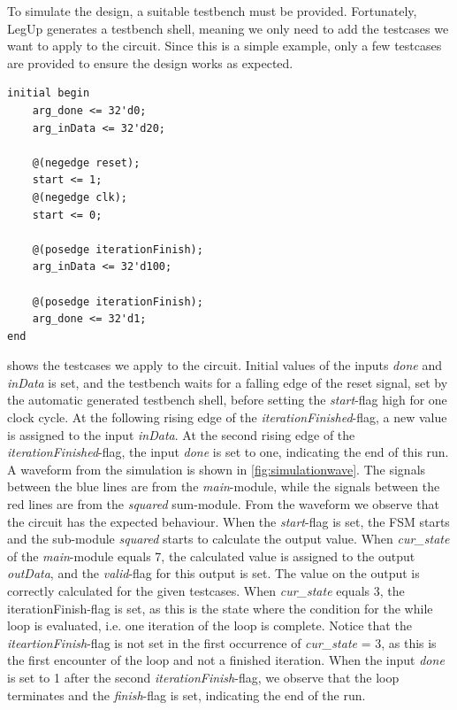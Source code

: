 To simulate the design, a suitable testbench must be provided. Fortunately, LegUp generates a testbench shell, meaning we only need to add the testcases we want to apply to the circuit. Since this is a simple example, only a few testcases are provided to ensure the design works as expected. 
\begin{lstlisting}[caption={Testcases for the example testbench},label=lst:tbcases]
initial begin
    arg_done <= 32'd0;
    arg_inData <= 32'd20;
    
    @(negedge reset);
    start <= 1;
    @(negedge clk);
    start <= 0;
    
    @(posedge iterationFinish);
    arg_inData <= 32'd100;
    
    @(posedge iterationFinish);
    arg_done <= 32'd1;
end
\end{lstlisting}
 shows the testcases we apply to the circuit. Initial values of the inputs \textit{done} and \textit{inData} is set, and the testbench waits for a falling edge of the reset signal, set by the automatic generated testbench shell, before setting the \textit{start}-flag high for one clock cycle. At the following rising edge of the \textit{iterationFinished}-flag, a new value is assigned to the input \textit{inData}. At the second rising edge of the \textit{iterationFinished}-flag, the input \textit{done} is set to one, indicating the end of this run. A waveform from the simulation is shown in \cref{fig:simulationwave}. The signals between the blue lines are from the \textit{main}-module, while the signals between the red lines are from the \textit{squared} sum-module. From the waveform we observe that the circuit has the expected behaviour. When the \textit{start}-flag is set, the FSM starts and the sub-module \textit{squared} starts to calculate the output value. When \textit{cur\_state} of the \textit{main}-module equals 7, the calculated value is assigned to the output \textit{outData}, and the \textit{valid}-flag for this output is set. The value on the output is correctly calculated for the given testcases. When \textit{cur\_state} equals 3, the {iterationFinish}-flag is set, as this is the state where the condition for the while loop is evaluated, i.e. one iteration of the loop is complete. Notice that the \textit{iteartionFinish}-flag is not set in the first occurrence of \textit{cur\_state} = 3, as this is the first encounter of the loop and not a finished iteration. When the input \textit{done} is set to 1 after the second \textit{iterationFinish}-flag, we observe that the loop terminates and the \textit{finish}-flag is set, indicating the end of the run.

